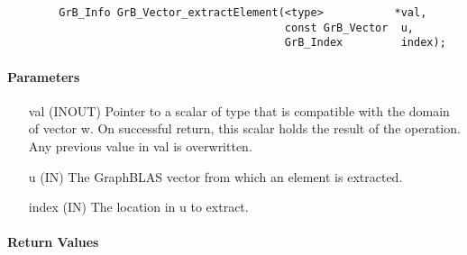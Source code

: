 \begin{verbatim}
        GrB_Info GrB_Vector_extractElement(<type>           *val,
                                           const GrB_Vector  u,
                                           GrB_Index         index); 
\end{verbatim}

\paragraph{Parameters}

\begin{itemize}[leftmargin=1in]
    \item[{\sf val}]   ({\sf INOUT}) Pointer to a scalar of type that is 
    compatible with the domain of vector {\sf w}. On successful return, this scalar 
    holds the result of the operation. Any previous value in {\sf val} is 
    overwritten.

    \item[{\sf u}]     ({\sf IN}) The GraphBLAS vector from which an element
    is extracted.
    
    \item[{\sf index}] ({\sf IN}) The location in {\sf u} to extract.
\end{itemize}

\paragraph{Return Values}

